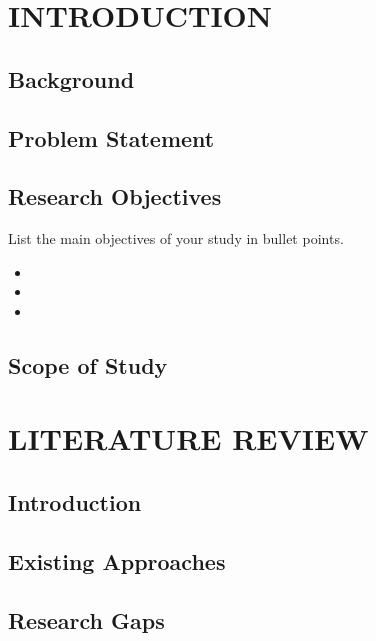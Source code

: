 \documentclass{SOICTthesis}  %
\begin{document}
\theabstract{
    \lipsum[1-2]  %
}

\chapter{INTRODUCTION}
\section{Background}
\lipsum[3-5]  %
\cite{b1, b3}

\section{Problem Statement}
\lipsum[6-7]
\cite{b2, b4}

\section{Research Objectives}
List the main objectives of your study in bullet points.
\begin{itemize}
    \item \lipsum[8]
    \item \lipsum[9]
    \item \lipsum[10]
\end{itemize}

\section{Scope of Study}
\lipsum[11-12]

\chapter{LITERATURE REVIEW}
\section{Introduction}
\lipsum[13-15]
\cite{b5, b7}

\section{Existing Approaches}
\lipsum[16-18]
\cite{b6, b8}

\section{Research Gaps}
\lipsum[19-21]
\end{document}
